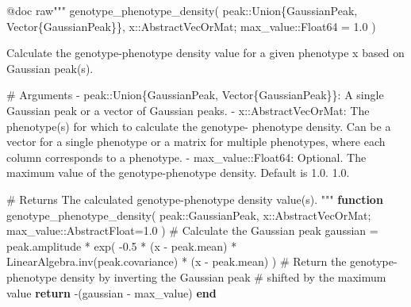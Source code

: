 \documentclass[
]{scrartcl}
\newenvironment{Shaded}{\begin{snugshade}}{\end{snugshade}}
\newcommand{\BuiltInTok}[1]{\textcolor[rgb]{0.00,0.23,0.31}{#1}}
\newcommand{\CharTok}[1]{\textcolor[rgb]{0.13,0.47,0.30}{#1}}
\newcommand{\CommentTok}[1]{\textcolor[rgb]{0.37,0.37,0.37}{#1}}
\newcommand{\ControlFlowTok}[1]{\textcolor[rgb]{0.00,0.23,0.31}{\textbf{#1}}}
\newcommand{\DataTypeTok}[1]{\textcolor[rgb]{0.68,0.00,0.00}{#1}}
\newcommand{\FloatTok}[1]{\textcolor[rgb]{0.68,0.00,0.00}{#1}}
\newcommand{\FunctionTok}[1]{\textcolor[rgb]{0.28,0.35,0.67}{#1}}
\newcommand{\KeywordTok}[1]{\textcolor[rgb]{0.00,0.23,0.31}{\textbf{#1}}}
\newcommand{\NormalTok}[1]{\textcolor[rgb]{0.00,0.23,0.31}{#1}}
\newcommand{\OperatorTok}[1]{\textcolor[rgb]{0.37,0.37,0.37}{#1}}
\newcommand{\PreprocessorTok}[1]{\textcolor[rgb]{0.68,0.00,0.00}{#1}}
\newcommand{\StringTok}[1]{\textcolor[rgb]{0.13,0.47,0.30}{#1}}
\begin{document}
\begin{Shaded}
\begin{Highlighting}[]
\PreprocessorTok{@doc} \StringTok{raw"""}
\StringTok{    genotype\_phenotype\_density(}
\StringTok{        peak::Union\{GaussianPeak, Vector\{GaussianPeak\}\}, }
\StringTok{        x::AbstractVecOrMat;}
\StringTok{        max\_value::Float64 = 1.0}
\StringTok{    )}

\StringTok{Calculate the genotype{-}phenotype density value for a given phenotype \textasciigrave{}x\textasciigrave{} based}
\StringTok{on Gaussian peak(s).}

\StringTok{\# Arguments}
\StringTok{{-} \textasciigrave{}peak::Union\{GaussianPeak, Vector\{GaussianPeak\}\}\textasciigrave{}: A single Gaussian peak or a}
\StringTok{  vector of Gaussian peaks.}
\StringTok{{-} \textasciigrave{}x::AbstractVecOrMat\textasciigrave{}: The phenotype(s) for which to calculate the genotype{-}}
\StringTok{  phenotype density. Can be a vector for a single phenotype or a matrix for}
\StringTok{  multiple phenotypes, where each column corresponds to a phenotype.}
\StringTok{{-} \textasciigrave{}max\_value::Float64\textasciigrave{}: Optional. The maximum value of the genotype{-}phenotype}
\StringTok{  density. Default is 1.0.}
\StringTok{  1.0.}

\StringTok{\# Returns}
\StringTok{The calculated genotype{-}phenotype density value(s).}
\StringTok{"""}
\KeywordTok{function} \FunctionTok{genotype\_phenotype\_density}\NormalTok{(}
\NormalTok{    peak}\OperatorTok{::}\DataTypeTok{GaussianPeak}\NormalTok{, x}\OperatorTok{::}\DataTypeTok{AbstractVecOrMat}\NormalTok{; max\_value}\OperatorTok{::}\DataTypeTok{AbstractFloat}\NormalTok{=}\FloatTok{1.0}
\NormalTok{)}
    \CommentTok{\# Calculate the Gaussian peak}
\NormalTok{    gaussian }\OperatorTok{=}\NormalTok{ peak.amplitude }\OperatorTok{*} \FunctionTok{exp}\NormalTok{(}
        \OperatorTok{{-}}\FloatTok{0.5} \OperatorTok{*}
\NormalTok{        (x }\OperatorTok{{-}}\NormalTok{ peak.mean)}\CharTok{\textquotesingle{} *}
        \BuiltInTok{LinearAlgebra}\NormalTok{.}\FunctionTok{inv}\NormalTok{(peak.covariance) }\OperatorTok{*}
\NormalTok{        (x }\OperatorTok{{-}}\NormalTok{ peak.mean)}
\NormalTok{    )}
    \CommentTok{\# Return the genotype{-}phenotype density by inverting the Gaussian peak}
    \CommentTok{\# shifted by the maximum value}
    \ControlFlowTok{return} \FunctionTok{{-}}\NormalTok{(gaussian }\OperatorTok{{-}}\NormalTok{ max\_value)}
\KeywordTok{end}


\end{Highlighting}
\end{Shaded}
\end{document}
